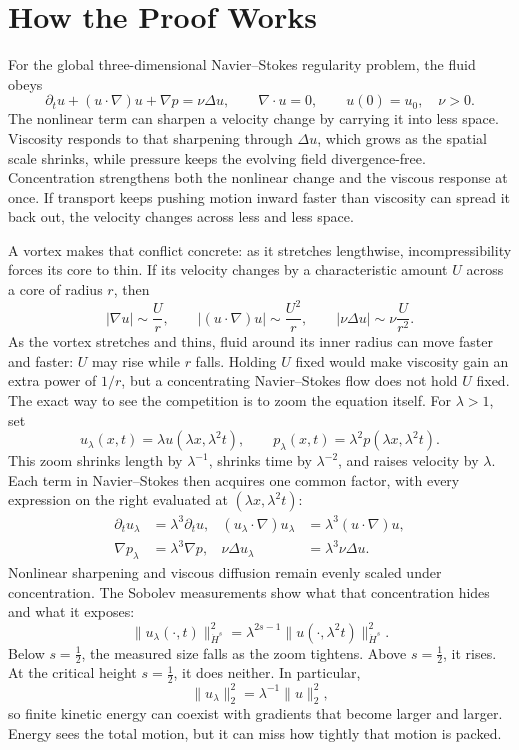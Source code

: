 \documentclass[11pt]{article}
\begin{document}
\section*{How the Proof Works}

For the global three-dimensional Navier--Stokes regularity problem, the fluid obeys
\[
\partial_tu+(u\cdot\nabla)u+\nabla p=\nu\Delta u,
\qquad
\nabla\cdot u=0,
\qquad
u(0)=u_0,
\quad \nu>0.
\]
The nonlinear term can sharpen a velocity change by carrying it into less space. Viscosity responds to that sharpening through $\Delta u$, which grows as the spatial scale shrinks, while pressure keeps the evolving field divergence-free. Concentration strengthens both the nonlinear change and the viscous response at once. If transport keeps pushing motion inward faster than viscosity can spread it back out, the velocity changes across less and less space.

A vortex makes that conflict concrete: as it stretches lengthwise, incompressibility forces its core to thin. If its velocity changes by a characteristic amount $U$ across a core of radius $r$, then
\[
|\nabla u|\sim \frac{U}{r},
\qquad
|(u\cdot\nabla)u|\sim \frac{U^2}{r},
\qquad
|\nu\Delta u|\sim \nu\frac{U}{r^2}.
\]
As the vortex stretches and thins, fluid around its inner radius can move faster and faster: $U$ may rise while $r$ falls. Holding $U$ fixed would make viscosity gain an extra power of $1/r$, but a concentrating Navier--Stokes flow does not hold $U$ fixed. The exact way to see the competition is to zoom the equation itself. For $\lambda>1$, set
\[
u_\lambda(x,t)=\lambda u(\lambda x,\lambda^2t),
\qquad
p_\lambda(x,t)=\lambda^2p(\lambda x,\lambda^2t).
\]
This zoom shrinks length by $\lambda^{-1}$, shrinks time by $\lambda^{-2}$, and raises velocity by $\lambda$. Each term in Navier--Stokes then acquires one common factor, with every expression on the right evaluated at $(\lambda x,\lambda^2t)$:
\[
\begin{aligned}
\partial_tu_\lambda&=\lambda^3\partial_tu,&
(u_\lambda\cdot\nabla)u_\lambda&=\lambda^3(u\cdot\nabla)u,\\
\nabla p_\lambda&=\lambda^3\nabla p,&
\nu\Delta u_\lambda&=\lambda^3\nu\Delta u.
\end{aligned}
\]
Nonlinear sharpening and viscous diffusion remain evenly scaled under concentration. The Sobolev measurements show what that concentration hides and what it exposes:
\[
\|u_\lambda(\cdot,t)\|_{\dot H^s}^2
=
\lambda^{2s-1}
\|u(\cdot,\lambda^2t)\|_{\dot H^s}^2.
\]
Below $s=\tfrac12$, the measured size falls as the zoom tightens. Above $s=\tfrac12$, it rises. At the critical height $s=\tfrac12$, it does neither. In particular,
\[
\|u_\lambda\|_2^2=\lambda^{-1}\|u\|_2^2,
\]
so finite kinetic energy can coexist with gradients that become larger and larger. Energy sees the total motion, but it can miss how tightly that motion is packed.
\end{document}
